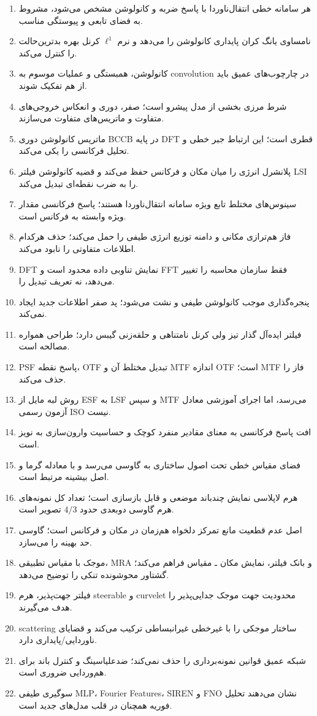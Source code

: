 \documentclass[12pt,openany,oneside]{book}
\begin{document}
\begin{enumerate}
\item هر سامانه خطی انتقال‌ناوردا با پاسخ ضربه و کانولوشن مشخص می‌شود، مشروط به فضای تابعی و پیوستگی مناسب.
\item نامساوی یانگ کران پایداری کانولوشن را می‌دهد و نرم \(\ell^1\) کرنل بهره بدترین‌حالت را کنترل می‌کند.
\item کانولوشن، همبستگی و عملیات موسوم به convolution در چارچوب‌های عمیق باید از هم تفکیک شوند.
\item شرط مرزی بخشی از مدل پیشرو است؛ صفر، دوری و انعکاس خروجی‌های متفاوت و ماتریس‌های متفاوت می‌سازند.
\item ماتریس کانولوشن دوری BCCB در پایه DFT قطری است؛ این ارتباط جبر خطی و تحلیل فرکانسی را یکی می‌کند.
\item پلانشرل انرژی را میان مکان و فرکانس حفظ می‌کند و قضیه کانولوشن فیلتر LSI را به ضرب نقطه‌ای تبدیل می‌کند.
\item سینوس‌های مختلط تابع ویژه سامانه انتقال‌ناوردا هستند؛ پاسخ فرکانسی مقدار ویژه وابسته به فرکانس است.
\item فاز هم‌ترازی مکانی و دامنه توزیع انرژی طیفی را حمل می‌کند؛ حذف هرکدام اطلاعات متفاوتی را نابود می‌کند.
\item DFT نمایش تناوبی داده محدود است و FFT فقط سازمان محاسبه را تغییر می‌دهد، نه تعریف تبدیل را.
\item پنجره‌گذاری موجب کانولوشن طیفی و نشت می‌شود؛ پد صفر اطلاعات جدید ایجاد نمی‌کند.
\item فیلتر ایده‌آل گذار تیز ولی کرنل نامتناهی و حلقه‌زنی گیبس دارد؛ طراحی همواره مصالحه است.
\item PSF پاسخ نقطه، OTF تبدیل مختلط آن و MTF اندازه OTF است؛ MTF فاز را حذف می‌کند.
\item روش لبه مایل از ESF به LSF و سپس MTF می‌رسد، اما اجرای آموزشی معادل آزمون رسمی ISO نیست.
\item افت پاسخ فرکانسی به معنای مقادیر منفرد کوچک و حساسیت وارون‌سازی به نویز است.
\item فضای مقیاس خطی تحت اصول ساختاری به گاوسی می‌رسد و با معادله گرما و اصل بیشینه مرتبط است.
\item هرم لاپلاسی نمایش چندباند موضعی و قابل بازسازی است؛ تعداد کل نمونه‌های هرم گاوسی دوبعدی حدود \(4/3\) تصویر است.
\item اصل عدم قطعیت مانع تمرکز دلخواه هم‌زمان در مکان و فرکانس است؛ گاوسی حد بهینه را می‌سازد.
\item موجک با مقیاس تطبیقی، MRA و بانک فیلتر، نمایش مکان ـ مقیاس فراهم می‌کند؛ گشتاور محوشونده تنکی را توضیح می‌دهد.
\item فیلتر جهت‌پذیر، هرم steerable و curvelet محدودیت جهت موجک جدایی‌پذیر را هدف می‌گیرند.
\item scattering ساختار موجکی را با غیرخطی غیرانبساطی ترکیب می‌کند و قضایای ناوردایی/پایداری دارد.
\item شبکه عمیق قوانین نمونه‌برداری را حذف نمی‌کند؛ ضدعلیاسینگ و کنترل باند برای هم‌وردایی ضروری است.
\item سوگیری طیفی MLP، Fourier Features، SIREN و FNO نشان می‌دهند تحلیل فوریه همچنان در قلب مدل‌های جدید است.
\end{enumerate}
\end{document}
